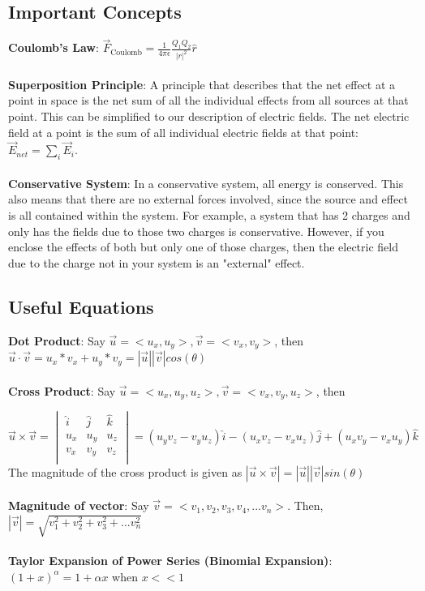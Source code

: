 \documentclass{article}
\begin{document}
\subsection{Important Concepts}
\textbf{Coulomb's Law}: $\vec{F}_{\text{Coulomb}} = \frac{1}{4\pi\epsilon} \frac{Q_1 Q_2}{|r|^2} \hat{r}$\\
\\
\textbf{Superposition Principle}: A principle that describes that the net effect at a point in space is the net sum of all the individual effects from all sources at that point. This can be simplified to our description of electric fields. The net electric field at a point is the sum of all individual electric fields at that point: $\vec{E}_{net} = \sum\limits_{i}\vec{E}_i$.\\
\\
\textbf{Conservative System}: In a conservative system, all energy is conserved. This also means that there are no external forces involved, since the source and effect is all contained within the system. For example, a system that has 2 charges and only has the fields due to those two charges is conservative. However, if you enclose the effects of both but only one of those charges, then the electric field due to the charge not in your system is an "external" effect.\\

\subsection{Useful Equations}
\textbf{Dot Product}: Say $\vec{u} = <u_x, u_y>, \vec{v} = <v_x, v_y>$, then  $\vec{u} \cdot \vec{v} = u_x*v_x + u_y*v_y = |\vec{u}||\vec{v}|cos(\theta)$ \\
\\
\textbf{Cross Product}: Say $\vec{u} = <u_x, u_y, u_z>, \vec{v} = <v_x, v_y, u_z>$, then 

\[
\vec{u} \times \vec{v} =
    \begin{vmatrix}
        \hat{i} & \hat{j} & \hat{k} \\
        u_x & u_y & u_z \\
        v_x & v_y & v_z \\
    \end{vmatrix}
= (u_y v_z - v_y u_z)\hat{i} - (u_x v_z - v_x u_z)\hat{j} + (u_x v_y - v_x u_y)\hat{k}
\]
The magnitude of the cross product is given as $|\vec{u} \times \vec{v}| = |\vec{u}||\vec{v}|sin(\theta)$ \\
\\
\textbf{Magnitude of vector}: Say $\vec{v} = <v_1, v_2, v_3, v_4, ... v_n>$. Then, $|\vec{v}| = \sqrt{v_1^2 + v_2^2 + v_3^2 + ... v_n ^2}$\\
\\
\textbf{Taylor Expansion of Power Series (Binomial Expansion)}: $(1 + x)^\alpha = 1 + \alpha x$ when $x << 1$
\pagebreak
\end{document}

